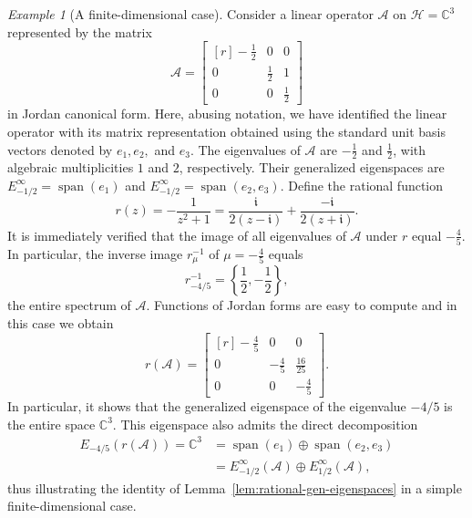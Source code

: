 \documentclass[12pt, oneside, reqno]{amsart}
\theoremstyle{remark}
\newtheorem{example}[theorem]{Example}
\newcommand{\ii}{\mathfrak{i}}
\DeclareMathOperator{\spn}{span}
\newcommand{\CC}{\mathbb{C}}
\newcommand{\Ac}{\mathcal{A}}
\newcommand{\Hc}{\mathcal{H}}
\begin{document}
\begin{example}[A finite-dimensional case] \label{ex:3x3}
  Consider a linear operator  $\Ac$ on $\Hc = \CC^3$  
  represented by the matrix 
  \[
    \Ac =
    \begin{bmatrix*}[r]
      -\frac{1}{2} & 0 & 0 \\
      0 & \frac{1}{2} & 1 \\
      0 & 0 & \frac{1}{2}
    \end{bmatrix*}
  \]
  in Jordan canonical form.  Here, abusing notation, we have
  identified the linear operator with its matrix representation
  obtained using  the standard unit basis vectors denoted by
  $e_1, e_2,$ and $e_3$.
  The eigenvalues of \(\Ac\) are \(-\frac{1}{2}\) and
  \(\frac{1}{2}\), with algebraic multiplicities \(1\) and \(2\),
  respectively.  Their generalized eigenspaces are
  $E^\infty_{-1/2} = \spn(e_1)$ and
  $E^\infty_{-1/2} = \spn(e_2, e_3)$.  Define the rational function
  \begin{equation}
    \label{eq:feast-N2}
    r(z) = -\frac{1}{z^2 + 1}
    = \frac{\ii}{2(z - \ii)} + \frac{-\ii}{2(z + \ii)}.    
  \end{equation}
  It is immediately verified that the image of all eigenvalues of
  $\Ac$ under $r$ equal \(-\frac{4}{5}\).  In particular, the inverse
  image $r^{-1}_\mu$ of \(\mu = -\frac{4}{5}\) equals 
  \begin{equation}
    \label{eq:3x3r-inv}
    r^{-1}_{-4/5} = \left\{\frac{1}{2}, -\frac{1}{2}\right\},
  \end{equation}
  the entire spectrum of $\Ac$.
  Functions of Jordan forms are easy to compute and in this case we obtain 
  \[
    r(\Ac) = 
    \begin{bmatrix*}[r]
      -\frac{4}{5} & 0 & 0 \\
      0 & -\frac{4}{5} & \frac{16}{25} \\[.25em]
      0 & 0 & -\frac{4}{5}
    \end{bmatrix*}.
  \]
  In particular, it shows that the generalized eigenspace of the
  eigenvalue $-4/5$ is the entire space $\CC^3$. This eigenspace also
  admits the direct decomposition
  \begin{align*}
    E_{-4/5}(r(\Ac)) = 
    \CC^3
    & =
    \spn(e_1)
    \oplus
    \spn(e_2, e_3)
    \\
    & =
    E_{-1/2}^\infty(\Ac) \oplus E_{1/2}^\infty(\Ac),
  \end{align*}
  thus illustrating the identity of
  Lemma~\ref{lem:rational-gen-eigenspaces} in a simple
  finite-dimensional case.
\end{example}
\end{document}
